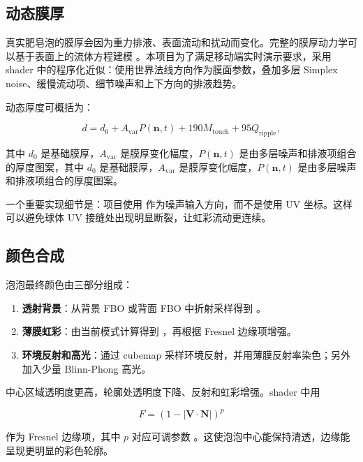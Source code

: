 \subsection{动态膜厚}

真实肥皂泡的膜厚会因为重力排液、表面流动和扰动而变化。完整的膜厚动力学可以基于表面上的流体方程建模 \cite{ishida2020thickness}。本项目为了满足移动端实时演示要求，采用 shader 中的程序化近似：使用世界法线方向作为膜面参数，叠加多层 Simplex noise、缓慢流动项、细节噪声和上下方向的排液趋势。

动态厚度可概括为：

\[
d =
d_0
+ A_{\mathrm{var}} P(\mathbf{n}, t)
+ 190 M_{\mathrm{touch}}
+ 95 Q_{\mathrm{ripple}},
\]

其中 $d_0$ 是基础膜厚，$A_{\mathrm{var}}$ 是膜厚变化幅度，$P(\mathbf{n},t)$ 是由多层噪声和排液项组合的厚度图案，其中 $d_0$ 是基础膜厚，$A_{\mathrm{var}}$ 是膜厚变化幅度，$P(\mathbf{n},t)$ 是由多层噪声和排液项组合的厚度图案。

一个重要实现细节是：项目使用  作为噪声输入方向，而不是使用 UV 坐标。这样可以避免球体 UV 接缝处出现明显断裂，让虹彩流动更连续。

\subsection{颜色合成}

泡泡最终颜色由三部分组成：

\begin{enumerate}
  \item \textbf{透射背景}：从背景 FBO 或背面 FBO 中折射采样得到 。
  \item \textbf{薄膜虹彩}：由当前模式计算得到 ，再根据 Fresnel 边缘项增强。
  \item \textbf{环境反射和高光}：通过 cubemap 采样环境反射，并用薄膜反射率染色；另外加入少量 Blinn-Phong 高光。
\end{enumerate}

中心区域透明度更高，轮廓处透明度下降、反射和虹彩增强。shader 中用

\[
F = (1 - |\mathbf{V}\cdot\mathbf{N}|)^{p}
\]

作为 Fresnel 边缘项，其中 $p$ 对应可调参数 。这使泡泡中心能保持清透，边缘能呈现更明显的彩色轮廓。
